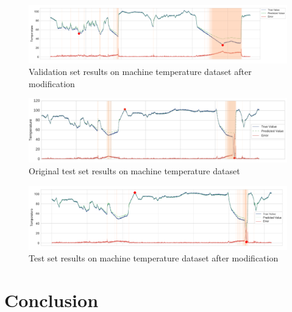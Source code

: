 \documentclass{article}
\begin{document}
\begin{figure}[htb]
	    \centering
\includegraphics[scale=0.28]{png/m-validationResult.png}
    \caption{Validation set results on machine temperature dataset after
modification}
    \label{fig:m-validationResult}
\end{figure}

\begin{figure}[htb]
	    \centering
\includegraphics[scale=0.42]{png/o-testResult.png}
    \caption{Original test set results on machine temperature dataset}
    \label{fig:o-testResult}
\end{figure}

\begin{figure}[htb]
	    \centering
\includegraphics[scale=0.26]{png/m-testResult.png}
    \caption{Test set results on machine temperature dataset after
modification}
    \label{fig:m-testResult}
\end{figure}


\section{Conclusion}



\clearpage




\end{document}
